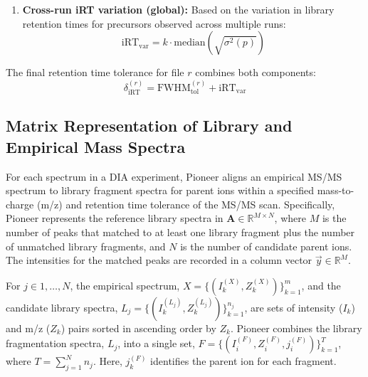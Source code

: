 \documentclass[pdflatex,sn-nature]{sn-jnl}
\begin{document}
\begin{enumerate}
{\begin{enumerate}
    \item \textbf{Cross-run iRT variation (global):} Based on the variation in library retention times for precursors observed across multiple runs:
    \begin{equation}
        \text{iRT}_{\text{var}} = k \cdot \text{median} \left(\sqrt{\sigma^2(p)}\right)
        \label{eq:irt_var}
    \end{equation}
\end{enumerate}
The final retention time tolerance for file $r$ combines both components:
\begin{equation}
    \delta_{\text{iRT}}^{(r)} = \text{FWHM}_{\text{tol}}^{(r)} + \text{iRT}_{\text{var}}
\end{equation}
}
\end{enumerate}





\subsection{Matrix Representation of Library and Empirical Mass Spectra}\label{subsec:matrix-representation}

For each spectrum in a DIA experiment, Pioneer aligns an empirical MS/MS spectrum to library fragment spectra for parent ions within a specified mass-to-charge (m/z) and retention time tolerance of the MS/MS scan. Specifically, Pioneer represents the reference library spectra in $\mathbf{A} \in \mathbb{R}^{M \times N}$,  where $M$ is the number of peaks that matched to at least one library fragment plus the number of unmatched library fragments, and $N$ is the number of candidate parent ions. The intensities for the matched peaks are recorded in a column vector $\vec{y} \in \mathbb{R}^{M}$.

For $j \in {1,\ldots,N}$, the empirical spectrum, $X = \{(I_k^{(X)},Z_k^{(X)})\}_{k=1}^m$, and the candidate library spectra, $L_j = \{(I_k^{(L_j)}, Z_k^{(L_j)})\}_{k=1}^{n_j}$, are sets of intensity ($I_k$) and m/z ($Z_k$) pairs sorted in ascending order by $Z_k$. Pioneer combines the library fragmentation spectra, $L_j$, into a single set, $F = \{(I_i^{(F)}, Z_i^{(F)}, j_i^{(F)})\}_{k=1}^{T}$, where $T = \sum_{j=1}^{N}n_j$. Here, $j_k^{(F)}$ identifies the parent ion for each fragment.
\end{document}
